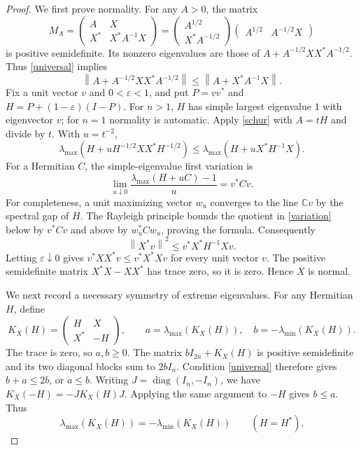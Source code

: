 \documentclass[11pt]{article}
\newcommand{\diag}{\operatorname{diag}}
\newcommand{\norm}[1]{\left\lVert#1\right\rVert}
\begin{document}
\begin{proof}
We first prove normality. For any $A>0$, the matrix
\[
 M_A=\begin{pmatrix}A&X\\X^*&X^*A^{-1}X\end{pmatrix}
 =\begin{pmatrix}A^{1/2}\\X^*A^{-1/2}\end{pmatrix}
   \begin{pmatrix}A^{1/2}&A^{-1/2}X\end{pmatrix}
\]
is positive semidefinite. Its nonzero eigenvalues are those of
$A+A^{-1/2}XX^*A^{-1/2}$. Thus \eqref{universal} implies
\begin{equation}\label{schur}
 \norm{A+A^{-1/2}XX^*A^{-1/2}}
 \leq\norm{A+X^*A^{-1}X}.
\end{equation}
Fix a unit vector $v$ and $0<\varepsilon<1$, and put
$P=vv^*$ and $H=P+(1-\varepsilon)(I-P)$. For $n>1$, $H$ has simple
largest eigenvalue $1$ with eigenvector $v$; for $n=1$ normality is automatic.
Apply \eqref{schur} with $A=tH$ and divide by $t$. With $u=t^{-2}$,
\[
 \lambda_{\max}(H+uH^{-1/2}XX^*H^{-1/2})
 \leq\lambda_{\max}(H+uX^*H^{-1}X).
\]
For a Hermitian $C$, the simple-eigenvalue first variation is
\begin{equation}\label{variation}
 \lim_{u\downarrow0}\frac{\lambda_{\max}(H+uC)-1}{u}=v^*Cv.
\end{equation}
For completeness, a unit maximizing vector $w_u$ converges to the line
$\mathbb Cv$ by the spectral gap of $H$. The Rayleigh principle bounds
the quotient in \eqref{variation} below by $v^*Cv$ and above by
$w_u^*Cw_u$, proving the formula.
Consequently
\[
 \norm{X^*v}^2\leq v^*X^*H^{-1}Xv.
\]
Letting $\varepsilon\downarrow0$ gives
$v^*XX^*v\leq v^*X^*Xv$ for every unit vector $v$.
The positive semidefinite matrix $X^*X-XX^*$ has trace zero, so it is zero.
Hence $X$ is normal.

We next record a necessary symmetry of extreme eigenvalues. For any
Hermitian $H$, define
\[
 K_X(H)=\begin{pmatrix}H&X\\X^*&-H\end{pmatrix},\qquad
 a=\lambda_{\max}(K_X(H)),\quad b=-\lambda_{\min}(K_X(H)).
\]
The trace is zero, so $a,b\geq0$. The matrix $bI_{2n}+K_X(H)$ is positive
semidefinite and its two diagonal blocks sum to $2bI_n$.
Condition \eqref{universal} therefore gives $b+a\leq2b$, or $a\leq b$.
Writing $J=\diag(I_n,-I_n)$, we have
$K_X(-H)=-J K_X(H)J$. Applying the same argument to $-H$ gives $b\leq a$.
Thus
\begin{equation}\label{symmetry}
 \lambda_{\max}(K_X(H))=-\lambda_{\min}(K_X(H))
 \qquad(H=H^*).
\end{equation}


\end{proof}
\end{document}
